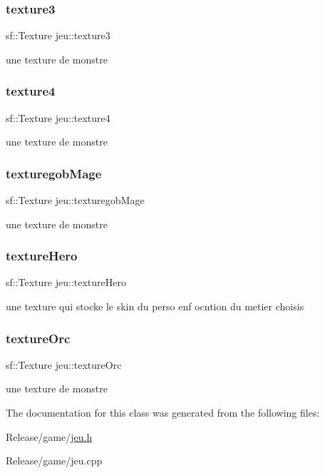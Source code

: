 \subsubsection{\texorpdfstring{texture3}{texture3}}
{\footnotesize\ttfamily sf\+::\+Texture jeu\+::texture3}

une texture de monstre \mbox{\label{classjeu_a81c879ee186537a4e177bb29d9dbd7bc}} 
\subsubsection{\texorpdfstring{texture4}{texture4}}
{\footnotesize\ttfamily sf\+::\+Texture jeu\+::texture4}

une texture de monstre \mbox{\label{classjeu_a558ca100cca1c6e3e97adba954a404fe}} 
\subsubsection{\texorpdfstring{texturegob\+Mage}{texturegobMage}}
{\footnotesize\ttfamily sf\+::\+Texture jeu\+::texturegob\+Mage}

une texture de monstre \mbox{\label{classjeu_acba2731c1a3cf75b98bfba2149a00c8e}} 
\subsubsection{\texorpdfstring{texture\+Hero}{textureHero}}
{\footnotesize\ttfamily sf\+::\+Texture jeu\+::texture\+Hero}

une texture qui stocke le skin du perso enf ocntion du metier choisis \mbox{\label{classjeu_a0082b3920e78d4471d157a53608e1674}} 
\subsubsection{\texorpdfstring{texture\+Orc}{textureOrc}}
{\footnotesize\ttfamily sf\+::\+Texture jeu\+::texture\+Orc}

une texture de monstre 

The documentation for this class was generated from the following files\+:\begin{DoxyCompactItemize}
\item 
Release/game/\mbox{\hyperlink{jeu_8h}{jeu.\+h}}\item 
Release/game/jeu.\+cpp\end{DoxyCompactItemize}
